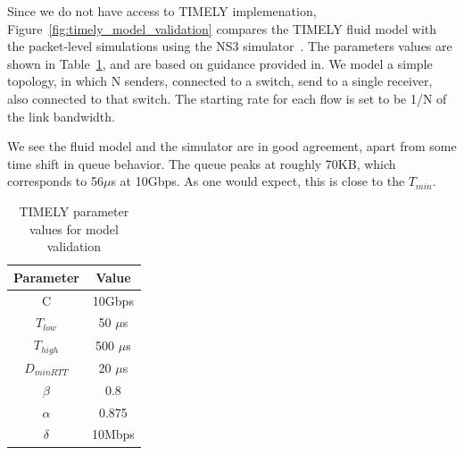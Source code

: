 Since we do not have access to TIMELY implemenation,
Figure~\ref{fig:timely_model_validation} compares the TIMELY fluid model with
the packet-level simulations using the NS3 simulator~\cite{ns3}. The parameters
values are shown in Table~\ref{tab:timely_model_validation}, and are based on
guidance provided in\cite{timely}.  We model a simple topology, in which N
senders, connected to a switch, send to a single receiver, also connected to
that switch. The starting rate for each flow is set to be 1/N of the link
bandwidth. 

We see the fluid model and the simulator are in good agreement, apart from some
time shift in queue behavior. The queue peaks at roughly 70KB, which corresponds
to 56$\mu$s at 10Gbps. As one would expect, this is close to the $T_{min}$.

\begin{table}[t]
\small
\center
\begin{tabular}{c|c}
Parameter & Value \\ \hline
C & 10Gbps \\ 
$T_{low}$ & 50 $\mu$s \\ 
$T_{high}$ & 500 $\mu$s \\
$D_{minRTT}$ & 20 $\mu$s \\
$\beta$ & 0.8 \\
$\alpha$ & 0.875 \\
$\delta$ & 10Mbps
\end{tabular}
\caption{TIMELY parameter values for model validation}
\label{tab:timely_model_validation}
\end{table}

